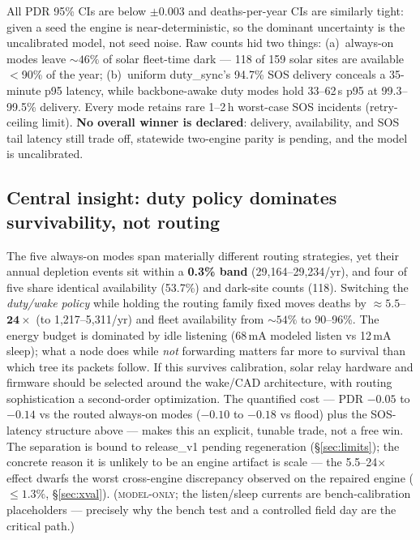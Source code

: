 \documentclass[11pt]{article}
\newcommand{\modelonly}{\textsc{model-only}}
\begin{document}
All PDR 95\% CIs are below $\pm 0.003$ and deaths-per-year CIs are similarly
tight: given a seed the engine is near-deterministic, so the dominant
uncertainty is the uncalibrated model, not seed noise. Raw counts hid two
things: (a)~always-on modes leave ${\sim}46\%$ of solar fleet-time dark ---
118 of 159 solar sites are available $<$90\% of the year; (b)~uniform
duty\_sync's 94.7\% SOS delivery conceals a 35-minute p95 latency, while
backbone-awake duty modes hold 33--62\,s p95 at 99.3--99.5\% delivery. Every
mode retains rare 1--2\,h worst-case SOS incidents (retry-ceiling limit).
\textbf{No overall winner is declared}: delivery, availability, and SOS tail
latency still trade off, statewide two-engine parity is pending, and the
model is uncalibrated.

\subsection{Central insight: duty policy dominates survivability, not routing}\label{sec:insight}

The five always-on modes span materially different routing strategies, yet
their annual depletion events sit within a \textbf{0.3\% band}
(29{,}164--29{,}234/yr), and four of five share identical availability
(53.7\%) and dark-site counts (118). Switching the \emph{duty/wake policy}
while holding the routing family fixed moves deaths by
$\boldsymbol{\approx 5.5}$--$\boldsymbol{24\times}$ (to 1{,}217--5{,}311/yr)
and fleet availability from ${\sim}54\%$ to 90--96\%. The energy budget is
dominated by idle listening (68\,mA modeled listen vs 12\,mA sleep); what a
node does while \emph{not} forwarding matters far more to survival than
which tree its packets follow. If this survives calibration, solar relay
hardware and firmware should be selected around the wake/CAD architecture,
with routing sophistication a second-order optimization. The quantified cost
--- PDR $-0.05$ to $-0.14$ vs the routed always-on modes ($-0.10$ to $-0.18$
vs flood) plus the SOS-latency structure above --- makes this an explicit,
tunable trade, not a free win. The separation is bound to release\_v1 pending regeneration (\S\ref{sec:limits}); the concrete reason it is unlikely to be an engine artifact is scale --- the 5.5--24$\times$ effect dwarfs the worst cross-engine discrepancy observed on the repaired engine ($\leq 1.3\%$, \S\ref{sec:xval}). (\modelonly; the listen/sleep currents are
bench-calibration placeholders --- precisely why the bench test and a
controlled field day are the critical path.)
\end{document}
